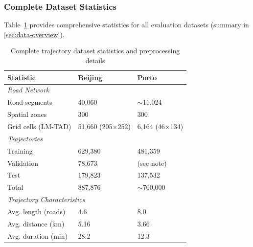 \subsubsection{Complete Dataset Statistics}
\label{app:dataset-stats}

Table~\ref{tab:dataset-stats-appendix} provides comprehensive statistics for all evaluation datasets (summary in \autoref{sec:data-overview}).

\begin{table}[H]
    \centering
    \caption{Complete trajectory dataset statistics and preprocessing details}
    \label{tab:dataset-stats-appendix}
    \small
    \begin{tabular}{lll}
        \toprule
        \textbf{Statistic}              & \textbf{Beijing}        & \textbf{Porto}        \\
        \midrule
        \multicolumn{3}{l}{\textit{Road Network}}                                    \\
        \quad Road segments             & 40,060                  & $\sim$11,024          \\
        \quad Spatial zones             & 300                     & 300                   \\
        \quad Grid cells (LM-TAD)       & 51,660 (205$\times$252) & 6,164 (46$\times$134) \\
        \midrule
        \multicolumn{3}{l}{\textit{Trajectories}}                                    \\
        \quad Training                  & 629,380                 & 481,359               \\
        \quad Validation                & 78,673                  & (see note)            \\
        \quad Test                      & 179,823                 & 137,532               \\
        \quad Total                     & 887,876                 & $\sim$700,000         \\
        \midrule
        \multicolumn{3}{l}{\textit{Trajectory Characteristics}}                      \\
        \quad Avg. length (roads)       & 4.6                     & 8.0                   \\
        \quad Avg. distance (km)        & 5.16                    & 3.66                  \\
        \quad Avg. duration (min)       & 28.2                    & 12.3                  \\

\end{tabular}
\end{table}
